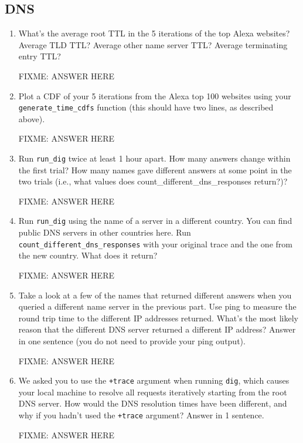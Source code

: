 \documentclass[10pt]{article}
\begin{document}
\subsection*{DNS}

\begin{enumerate}

\item What's the average root TTL in the 5 iterations of the top Alexa websites? Average TLD TTL? Average other name server TTL? Average terminating entry TTL?

FIXME: ANSWER HERE

\item Plot a CDF of your 5 iterations from the Alexa top 100 websites using your \texttt{generate\_time\_cdfs} function (this should have two lines, as described above).

FIXME: ANSWER HERE

\item Run \texttt{run\_dig} twice at least 1 hour apart. How many answers change within the first trial? How many names gave different answers at some point in the two trials (i.e., what values does {count\_different\_dns\_responses} return?)?

FIXME: ANSWER HERE

\item Run \texttt{run\_dig} using the name of a server in a different country. You can find public DNS servers in other countries here. 
Run \texttt{count\_different\_dns\_responses} with your original trace and the one from the new country. What does it return?

FIXME: ANSWER HERE

\item Take a look at a few of the names that returned different answers when you queried a different name server in the previous part. Use ping to measure the round trip time to the different IP addresses returned. What's the most likely reason that the different DNS server returned a different IP address? Answer in one sentence (you do not need to provide your ping output).

FIXME: ANSWER HERE

\item We asked you to use the \texttt{+trace} argument when running \texttt{dig}, which causes your local machine to resolve all requests iteratively starting from the root DNS server. How would the DNS resolution times have been different, and why if you hadn't used the \texttt{+trace} argument? Answer in 1 sentence.

FIXME: ANSWER HERE

\end{enumerate}
\end{document}
